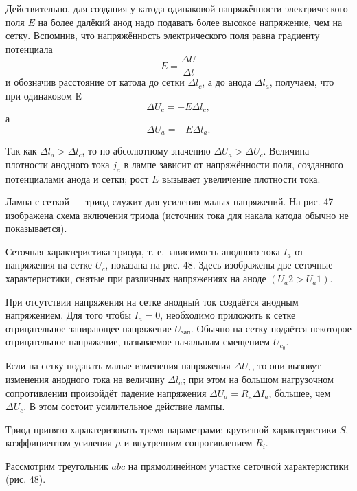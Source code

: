 \documentclass[a4paper,10pt]{book}
\begin{document}
Действительно, для создания у катода одинаковой напряжённости электрического поля $E$ на более далёкий анод надо подавать более высокое напряжение, чем на сетку. Вспомнив, что напряжённость электрического поля равна градиенту потенциала\begin{equation}
E = \frac{\Delta U}{\Delta l}\nonumber
\end{equation} и обозначив расстояние от катода до сетки $\Delta l_c$, а до анода $\Delta l_a$, получаем, что при одинаковом E\begin{equation}
\Delta U_c = -E\Delta l_c,\nonumber
\end{equation} а \begin{equation}
\Delta U_a = -E\Delta l_a.\nonumber
\end{equation}

Так как $\Delta l_a>\Delta l_c$, то по абсолютному значению $\Delta U_a>\Delta U_c$. Величина плотности анодного тока $j_a$ в лампе зависит от напряжённости поля, созданного потенциалами анода и сетки; рост $E$ вызывает увеличение плотности тока.

Лампа с сеткой — триод служит для усиления малых напряжений. На рис. 47 изображена схема включения триода (источник тока для накала катода обычно не показывается).

Сеточная характеристика триода, т. е. зависимость анодного тока $I_a$ от напряжения на сетке $U_c$, показана на рис. 48. Здесь изображены две сеточные характеристики, снятые при различных напряжениях на аноде $(U_a2>U_a1)$.

При отсутствии напряжения на сетке анодный ток создаётся анодным напряжением. Для того чтобы $I_a=0$, необходимо приложить к сетке отрицательное запирающее напряжение $U_\text{зап}$. Обычно на сетку подаётся некоторое отрицательное напряжение, называемое начальным смещением $U_{c_0}$.

Если на сетку подавать малые изменения напряжения $\Delta U_c$, то они вызовут изменения анодного тока на величину $\Delta l_a$; при этом на большом нагрузочном сопротивлении произойдёт падение напряжения $\Delta U_a=R_\text{н} \Delta I_a$, б$\acute{\text{о}}$льшее, чем $\Delta U_c$. В этом состоит усилительное действие лампы.

Триод принято характеризовать тремя параметрами: крутизной характеристики $S$, коэффициентом усиления $\mu$ и внутренним сопротивлением $R_i$.

Рассмотрим треугольник $abc$ на прямолинейном участке сеточной характеристики (рис. 48).
\end{document}
